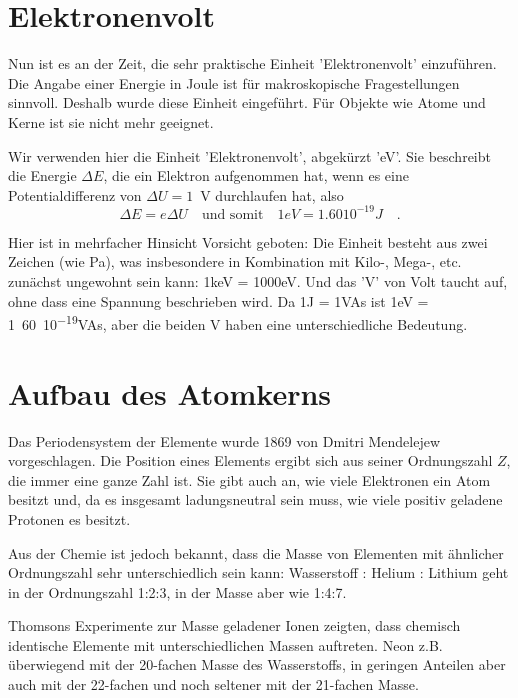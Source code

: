     

\section{Elektronenvolt}

Nun ist es an der Zeit, die sehr praktische Einheit 'Elektronenvolt' einzuführen. Die Angabe einer Energie in Joule ist für makroskopische Fragestellungen sinnvoll. Deshalb wurde diese Einheit eingeführt. Für Objekte wie Atome und Kerne ist sie nicht mehr geeignet. 

Wir verwenden hier die Einheit 'Elektronenvolt', abgekürzt 'eV'. Sie beschreibt die Energie $\Delta E$, die ein Elektron aufgenommen hat, wenn es eine Potentialdifferenz von $\Delta U =1$~V durchlaufen hat, also 
\begin{equation}
    \Delta E = e \Delta U \quad \text{und somit} \quad \si{1}{eV} = \si{1.60 10^{-19}}{J} \quad .
\end{equation} 

Hier ist in mehrfacher Hinsicht Vorsicht geboten: Die Einheit besteht aus zwei Zeichen (wie Pa), was insbesondere in Kombination mit Kilo-, Mega-, etc. zunächst ungewohnt sein kann: \si{1}{keV} = \si{1000}{eV}. Und das 'V' von Volt taucht auf, ohne dass eine Spannung beschrieben wird. Da \si{1}{J} = \si{1}{VAs} ist \si{1}{eV} = \si{1.60 10^{-19}}{VAs}, aber die beiden V haben eine unterschiedliche Bedeutung.


\section{Aufbau des Atomkerns}

Das Periodensystem der Elemente wurde 1869 von Dmitri Mendelejew vorgeschlagen. Die Position eines Elements ergibt sich aus seiner Ordnungszahl $Z$, die immer eine ganze Zahl ist. Sie gibt auch an, wie viele Elektronen ein Atom besitzt und, da es insgesamt ladungsneutral sein muss, wie viele positiv geladene Protonen es besitzt. 

Aus der Chemie ist jedoch bekannt, dass die Masse von Elementen mit ähnlicher Ordnungszahl sehr unterschiedlich sein kann: Wasserstoff : Helium : Lithium geht in der Ordnungszahl 1:2:3, in der Masse aber wie 1:4:7.

Thomsons Experimente zur Masse geladener Ionen zeigten, dass chemisch identische Elemente mit unterschiedlichen Massen auftreten. Neon z.B. überwiegend mit der 20-fachen Masse des Wasserstoffs, in geringen Anteilen aber auch mit der 22-fachen und noch seltener mit der 21-fachen Masse.


